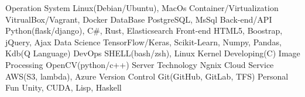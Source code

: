 \begin{cvhonors}
  	\cvhonor
    	{Operation System}
	{Linux(Debian/Ubuntu), MacOs}
    	{}
    	{}
	\cvhonor
	{Container/Virtualization}
	{VitrualBox/Vagrant, Docker}
	{}
	{}
	\cvhonor
    	{DataBase}
    	{PostgreSQL, MsSql}
    	{}
	{}
  	\cvhonor
    	{Back-end/API}
	{Python(flask/django), C\#, Rust, Elasticsearch}
    	{}
    	{}
	\cvhonor
	{Front-end}
	{HTML5, Boostrap, jQuery, Ajax}
	{}
	{}
  	\cvhonor
    	{Data Science}
	{TensorFlow/Keras, Scikit-Learn, Numpy, Pandas, Kdb(Q Language)}
    	{}
    	{}
	\cvhonor
	{DevOps}
	{SHELL(bash/zsh), Linux Kernel Developing(C)}
	{}
	{}
	\cvhonor
	{Image Processing}
	{OpenCV(python/c++)}
	{}
	{}
	\cvhonor
	{Server Technology}
	{Ngnix}
	{}
	{}
	\cvhonor
	{Cloud Service}
	{AWS(S3, lambda), Azure}
	{}
	{}
	\cvhonor
	{Version Control}
	{Git(GitHub, GitLab, TFS)}
	{}
	{}
	\cvhonor
	{Personal Fun}
	{Unity, CUDA, Lisp, Haskell}
	{}
	{}
\end{cvhonors}
